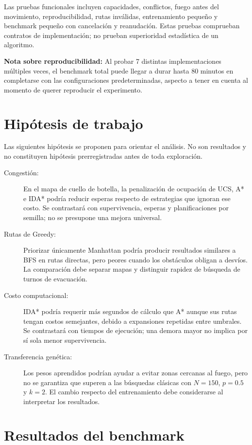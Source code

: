 \documentclass[11pt,letterpaper]{article}
\begin{document}
Las pruebas funcionales incluyen capacidades, conflictos, fuego antes del movimiento, reproducibilidad, rutas inválidas, entrenamiento pequeño y benchmark pequeño con cancelación y reanudación. Estas pruebas comprueban contratos de implementación; no prueban superioridad estadística de un algoritmo. 

\textbf{Nota sobre reproducibilidad:} Al probar 7 distintas implementaciones múltiples veces, el benchmark total puede llegar a durar hasta 80 minutos en completarse con las configuraciones predeterminadas, aspecto a tener en cuenta al momento de querer reproducir el experimento.

\section{Hipótesis de trabajo}
Las siguientes hipótesis se proponen para orientar el análisis. No son resultados y no constituyen hipótesis prerregistradas antes de toda exploración.
\begin{description}
\item[Congestión:] En el mapa de cuello de botella, la penalización de ocupación de UCS, A* e IDA* podría reducir esperas respecto de estrategias que ignoran ese costo. Se contrastará con supervivencia, esperas y planificaciones por semilla; no se presupone una mejora universal.
\item[Rutas de Greedy:] Priorizar únicamente Manhattan podría producir resultados similares a BFS en rutas directas, pero peores cuando los obstáculos obligan a desvíos. La comparación debe separar mapas y distinguir rapidez de búsqueda de turnos de evacuación.
\item[Costo computacional:] IDA* podría requerir más segundos de cálculo que A* aunque sus rutas tengan costos semejantes, debido a expansiones repetidas entre umbrales. Se contrastará con tiempos de ejecución; una demora mayor no implica por sí sola menor supervivencia.
\item[Transferencia genética:] Los pesos aprendidos podrían ayudar a evitar zonas cercanas al fuego, pero no se garantiza que superen a las búsquedas clásicas con $N=150$, $p=0.5$ y $k=2$. El cambio respecto del entrenamiento debe considerarse al interpretar los resultados.
\end{description}

\section{Resultados del benchmark}
\end{document}
